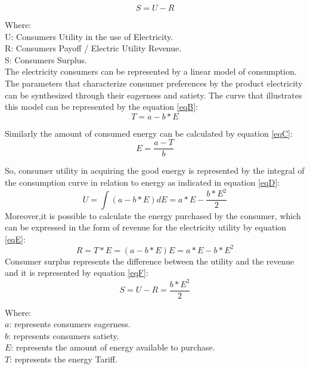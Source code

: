 \documentclass[preprint,12pt]{elsarticle}
\begin{document}
\begin{equation}
\label{eqA}
S = U - R
\end{equation}

Where:\\

U: Consumers Utility in the use of Electricity.\\
R: Consumers Payoff / Electric Utility Revenue.\\
S: Consumers Surplus.\\

The electricity consumers can be represented by a linear model of consumption. The parameters that characterize consumer preferences by the product electricity can be synthesized through their eagerness and satiety. The curve that illustrates this model can be represented by the equation \ref{eqB}:\\
\begin{equation}
T = a - b*E
\label{eqB}
\end{equation}

Similarly the amount of consumed energy can be calculated by equation \ref{eqC}:\\
\begin{equation}
E = \frac{a-T}{b}
\label{eqC}
\end{equation}

So, consumer utility in acquiring the good energy is represented by the integral of the consumption curve in relation to energy as indicated in equation \ref{eqD}:\\
\begin{equation}
U=\int(a-b*E)dE= a*E-\frac{b*E^2}{2}
\label{eqD}
\end{equation}
Moreover,it is possible to calculate the energy purchased by the consumer, which can be expressed in the form of revenue for the electricity utility by equation \ref{eqE}:\\
\begin{equation}
R= T*E = (a-b*E)E = a*E - b*E^2
\label{eqE}
\end{equation}
Consumer surplus represents the difference between the utility and the revenue and it is represented by equation \ref{eqF}:\\
 \begin{equation}
S = U-R = \frac{b*E^2}{2}
 \label{eqF}
 \end{equation}
 
Where:\\

$a$: represents consumers eagerness.\\
$b$: represents consumers satiety.\\
$E$: represents the amount of energy available to purchase.\\
$T$: represents the energy Tariff.\\ 
\end{document}
